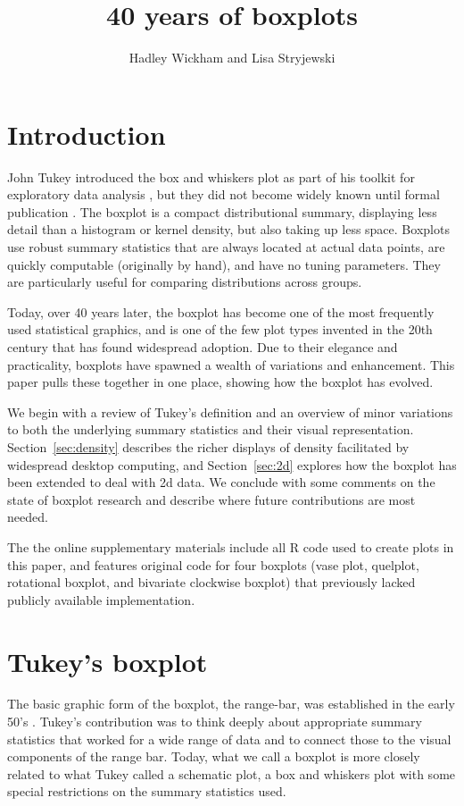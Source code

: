\documentclass[oneside]{article}
\title{40 years of boxplots}
\author{Hadley Wickham and Lisa Stryjewski}
\begin{document}
\maketitle 

\section{Introduction}

John Tukey introduced the box and whiskers plot as part of his toolkit for exploratory data analysis \citep{tukey:1970}, but they did not become widely known until formal publication \citep{tukey:1977}. The boxplot is a compact distributional summary, displaying less detail than a histogram or kernel density, but also taking up less space. Boxplots use robust summary statistics that are always located at actual data points, are quickly computable (originally by hand), and have no tuning parameters. They are particularly useful for comparing distributions across groups.

Today, over 40 years later, the boxplot has become one of the most frequently used statistical graphics, and is one of the few plot types invented in the 20th century that has found widespread adoption. Due to their elegance and practicality, boxplots have spawned a wealth of variations and enhancement. This paper pulls these together in one place, showing how the boxplot has evolved.

We begin with a review of Tukey's definition and an overview of minor variations to both the underlying summary statistics and their visual representation. Section~\ref{sec:density} describes the richer displays of density facilitated by widespread desktop computing, and Section~\ref{sec:2d} explores how the boxplot has been extended to deal with 2d data. We conclude with some comments on the state of boxplot research and describe where future contributions are most needed.

The the online supplementary materials include all R code \citep{R} used to create plots in this paper, and features original code for four boxplots (vase plot, quelplot, rotational boxplot, and bivariate clockwise boxplot) that previously lacked publicly available implementation.

\section{Tukey's boxplot}
\label{sec:tukey}

The basic graphic form of the boxplot, the range-bar, was established in the early 50's \citet[pg. 164]{spear:1952}. Tukey's contribution was to think deeply about appropriate summary statistics that worked for a wide range of data and to connect those to the visual components of the range bar. Today, what we call a boxplot is more closely related to what Tukey called a schematic plot, a box and whiskers plot with some special restrictions on the summary statistics used. %
\end{document}
